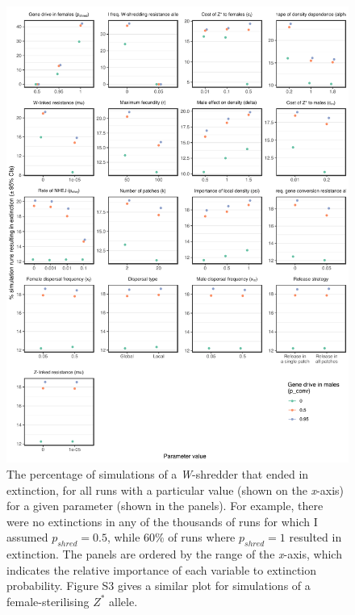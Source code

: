 \documentclass[]{rsos}%
\begin{document}
\begin{figure}[h]
\centering
\includegraphics[width=1.0\textwidth]{../figures/figure3.pdf}
\caption{\footnotesize{The percentage of simulations of a \textit{W}-shredder that ended in extinction, for all runs with a particular value (shown on the \textit{x}-axis) for a given parameter (shown in the panels). For example, there were no extinctions in any of the thousands of runs for which I assumed $p_{shred} = 0.5$, while 60\% of runs where $p_{shred} = 1$ resulted in extinction. The panels are ordered by the range of the \textit{x}-axis, which indicates the relative importance of each variable to extinction probability. Figure S3 gives a similar plot for simulations of a female-sterilising $Z^*$ allele.}}
\end{figure}
\newpage
\end{document}
